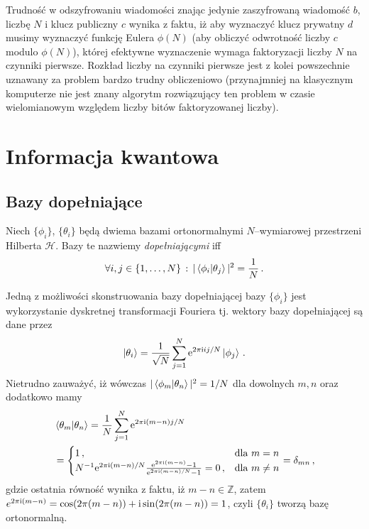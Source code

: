 \documentclass{myclass}
\begin{document}
Trudność w odszyfrowaniu wiadomości znając jedynie zaszyfrowaną wiadomość \(b\), liczbę \(N\) i
klucz publiczny \(c\) wynika z faktu, iż aby wyznaczyć klucz prywatny \(d\) musimy wyznaczyć funkcję
Eulera \(\phi(N)\) (aby obliczyć odwrotność liczby \(c\) modulo \(\phi(N)\)), której efektywne
wyznaczenie wymaga faktoryzacji liczby \(N\) na czynniki pierwsze. Rozkład liczby na czynniki
pierwsze jest z kolei powszechnie uznawany za problem bardzo trudny obliczeniowo (przynajmniej na
klasycznym komputerze nie jest znany algorytm rozwiązujący ten problem w czasie wielomianowym
względem liczby bitów faktoryzowanej liczby).


\section{Informacja kwantowa}

\subsection{Bazy dopełniające}
\begin{definition}
    Niech \(\{\phi_i\}\), \(\{\theta_i\}\)  będą dwiema bazami ortonormalnymi \(N\)--wymiarowej
    przestrzeni Hilberta \(\mathscr{H}\). Bazy te nazwiemy \textit{dopełniającymi} iff
    \begin{equation*}
        \forall i,j\in\{1,\ldots,N\}\,:\, |\braket{\phi_i}{\theta_j}|^2 = \frac{1}{N}\,.
    \end{equation*}
\end{definition}
Jedną z możliwości skonstruowania bazy dopełniającej bazy \(\{\phi_i\}\) jest wykorzystanie
dyskretnej transformacji Fouriera tj. wektory bazy dopełniającej są dane przez
\begin{equation*}
    \ket{\theta_i} = \frac{1}{\sqrt{N}}\sum_{j=1}^N \mathrm{e}^{2\pi\mathrm{i} ij/N}\ket{\phi_j}\,.
\end{equation*}
Nietrudno zauważyć, iż wówczas \(|\braket{\phi_m}{\theta_n}|^2 = 1/N\) dla dowolnych \(m, n\) oraz
dodatkowo mamy
\begin{equation*}
    \begin{split}
        &\braket{\theta_m}{\theta_n} = \frac{1}{N}\sum_{j=1}^N \mathrm{e}^{2\pi\mathrm{i}(m - n)j/N} \\
        &= \begin{cases}
            1\,,&\text{dla \(m=n\)}\\
            N^{-1}\mathrm{e}^{2\pi\mathrm{i}(m-n)/N}\frac{\mathrm{e}^{2\pi\mathrm{i}(m-n)} - 1}{\mathrm{e}^{2\pi\mathrm{i}(m-n)/N} - 1} = 0\,,&\text{dla \(m\neq n\)}
        \end{cases} = \delta_{mn}\,,
    \end{split}
\end{equation*}
gdzie ostatnia równość wynika z faktu, iż \(m-n\in\mathbb{Z}\), zatem \(e^{2\pi\mathrm{i}(m-n)} =
\cos(2\pi(m-n)) + \mathrm{i}\sin(2\pi(m-n)) = 1\), czyli \(\{\theta_i\}\) tworzą bazę ortonormalną.
\end{document}
